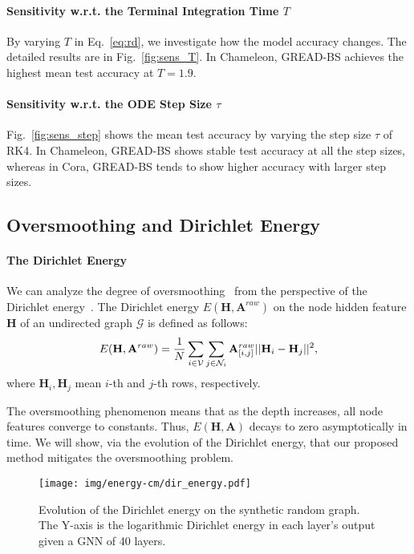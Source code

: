 \documentclass{article}
\theoremstyle{plain}
\theoremstyle{definition}
\theoremstyle{remark}
\begin{document}
\paragraph{Sensitivity w.r.t. the Terminal Integration Time $T$}
By varying $T$ in Eq.~\eqref{eq:rd}, we investigate how the model accuracy changes. The detailed results are in Fig.~\ref{fig:sens_T}. In Chameleon, GREAD-BS achieves the highest mean test accuracy at $T=1.9$. 

\paragraph{Sensitivity w.r.t. the ODE Step Size $\tau$}
Fig.~\ref{fig:sens_step} shows the mean test accuracy by varying the step size $\tau$ of RK4.
In Chameleon, GREAD-BS shows stable test accuracy at all the step sizes, whereas in Cora, GREAD-BS tends to show higher accuracy with larger step sizes.

\subsection{Oversmoothing and Dirichlet Energy}
\paragraph{The Dirichlet Energy} We can analyze the degree of oversmoothing~\cite{nt2019revisiting,oono2020oversmoothing} from the perspective of the Dirichlet energy~\cite{rusch2022gcon,rusch2023survey}. The Dirichlet energy $E(\mathbf{H}, \mathbf{A}^{raw})$ on the node hidden feature $\mathbf{H}$ of an undirected graph $\mathcal{G}$ is defined as follows:
\begin{align}\begin{small}
    \label{eq:energy}
    E(\mathbf{H}, \mathbf{A}^{raw})=\frac{1}{N}\sum_{i \in \mathcal{V}}\sum_{j \in \mathcal{N}_i} \mathbf{A}^{raw}_{[i,j]}||\mathbf{H}_i - \mathbf{H}_j ||^2,
\end{small}\end{align} where $\mathbf{H}_i, \mathbf{H}_j$ mean $i$-th and $j$-th rows, respectively.

The oversmoothing phenomenon means that as the depth increases, all node features converge to constants. Thus, $E(\mathbf{H}, \mathbf{A})$ decays to zero asymptotically in time. We will show, via the evolution of the Dirichlet energy, that our proposed method mitigates the oversmoothing problem.

\begin{figure}[t]
    \centering
    \texttt{[image: img/energy-cm/dir\_energy.pdf]}
    \caption{Evolution of the Dirichlet energy on the synthetic random graph. The Y-axis is the logarithmic Dirichlet energy in each layer’s output given a GNN of 40 layers.}
    \label{fig:energy}
\end{figure}
\end{document}
